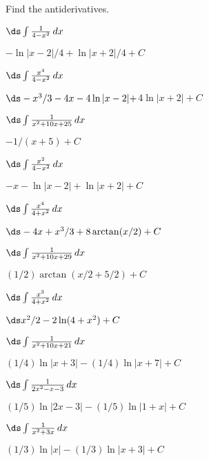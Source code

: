 \begin{exercises}

Find the antiderivatives.
\twocol

\exercise $\ds\int {1\over 4-x^2}\,dx$
\begin{answer} $-\ln|x-2|/4+\ln|x+2|/4+C$
\end{answer}

\exercise $\ds\int {x^4\over 4-x^2}\,dx$
\begin{answer} $\ds -x^3/3-4x-4\ln|x-2|+$\hfill\break$4\ln|x+2| +C$
\end{answer}

\exercise $\ds\int {1\over x^2+10x+25}\,dx$
\begin{answer} $-1/(x+5) +C$
\end{answer}

\exercise $\ds\int {x^2\over 4-x^2}\,dx$
\begin{answer} $-x-\ln|x-2|+\ln|x+2| +C$
\end{answer}

\exercise $\ds\int {x^4\over 4+x^2}\,dx$
\begin{answer} $\ds -4x+x^3/3+8\arctan(x/2) +C$
\end{answer}

\exercise $\ds\int {1\over x^2+10x+29}\,dx$
\begin{answer} $(1/2)\arctan(x/2+5/2) +C$
\end{answer}

\exercise $\ds\int {x^3\over 4+x^2}\,dx$
\begin{answer} $\ds x^2/2-2\ln(4+x^2) +C$
\end{answer}

\exercise $\ds\int {1\over x^2+10x+21}\,dx$
\begin{answer} $(1/4)\ln|x+3|-(1/4)\ln|x+7| +C$
\end{answer}

\exercise $\ds\int {1\over 2x^2-x-3}\,dx$
\begin{answer} $(1/5)\ln|2x-3|-(1/5)\ln|1+x| +C$
\end{answer}

\exercise $\ds\int {1\over x^2+3x}\,dx$
\begin{answer} $(1/3)\ln|x|-(1/3)\ln|x+3| +C$
\end{answer}

\endtwocol

\end{exercises}
